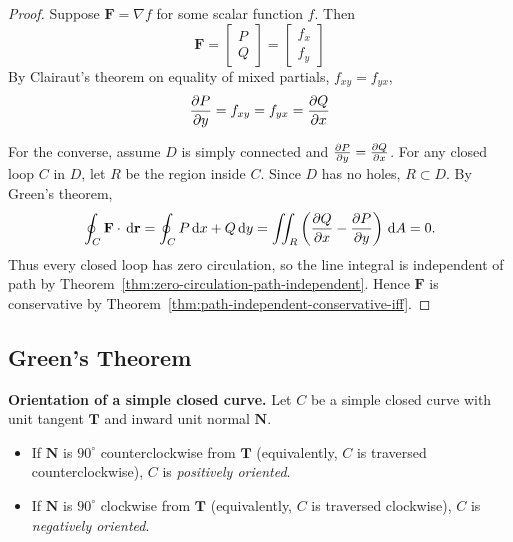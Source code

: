 \begin{proof}
  Suppose $\mathbf{F} = \nabla f$ for some scalar function $f$. Then
  \[
    \mathbf{F} =
    \begin{bmatrix}
      P \\ Q
    \end{bmatrix}
    =
    \begin{bmatrix}
      f_x \\ f_y
    \end{bmatrix}
  \]
  By Clairaut's theorem on equality of mixed partials, $f_{xy} = f_{yx}$,
  \[
    \frac{\partial P}{\partial y} = f_{xy} = f_{yx} = \frac{\partial Q}{\partial x}
  \]

  For the converse, assume $D$ is simply connected and $\frac{\partial P}{\partial y}=\frac{\partial Q}{\partial x}$.
  For any closed loop $C$ in $D$, let $R$ be the region inside $C$. Since $D$ has
  no holes, $R\subset D$. By Green's theorem,
  \[
    \oint_C \mathbf{F}\cdot \,\mathrm{d}\mathbf{r}
    =
    \oint_C P\,\mathrm{d}x+Q\,\mathrm{d}y
    =
    \iint_R \left(\frac{\partial Q}{\partial x}-\frac{\partial P}{\partial y}\right)\,\mathrm{d}A
    =
    0.
  \]
  Thus every closed loop has zero circulation, so the line integral is independent
  of path by Theorem~\ref{thm:zero-circulation-path-independent}. Hence
  $\mathbf{F}$ is conservative by Theorem~\ref{thm:path-independent-conservative-iff}.
\end{proof}

\begin{center}
\end{center}

\subsection{Green's Theorem}

\textbf{Orientation of a simple closed curve.} Let $C$ be a simple closed curve
with unit tangent $\mathbf{T}$ and inward unit normal $\mathbf{N}$.
\begin{itemize}
  \item If $\mathbf{N}$ is $90^\circ$ counterclockwise from $\mathbf{T}$
        (equivalently, $C$ is traversed counterclockwise), $C$ is
        \emph{positively oriented}.
  \item If $\mathbf{N}$ is $90^\circ$ clockwise from $\mathbf{T}$
        (equivalently, $C$ is traversed clockwise), $C$ is
        \emph{negatively oriented}.
\end{itemize}

